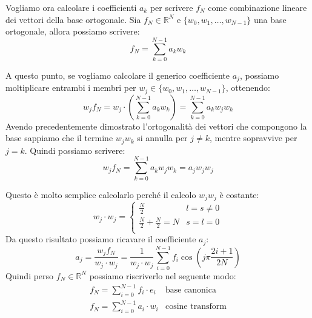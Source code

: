 Vogliamo ora calcolare i coefficienti $a_k$ per scrivere $f_N$ come combinazione
lineare dei vettori della base ortogonale. Sia $f_N \in \mathbb{R}^N$ e
$\{w_0,w_1,\dots,w_{N-1}\}$ una base ortogonale, allora possiamo scrivere:
\begin{equation*}
    f_N = \sum_{k=0}^{N-1} a_k w_k
\end{equation*}

A questo punto, se vogliamo calcolare il generico coefficiente $a_j$, possiamo
moltiplicare entrambi i membri per $w_j\in \{w_0,w_1,\dots,w_{N-1}\}$, ottenendo:
\begin{equation*}
    w_j f_N = w_j \cdot \left(\sum_{k=0}^{N-1} a_k w_k\right) = \sum_{k=0}^{N-1} a_k w_j w_k
\end{equation*}
Avendo precedentemente dimostrato l'ortogonalità dei vettori che compongono la
base sappiamo che il termine $w_j w_k$ si annulla per $j \neq k$, mentre sopravvive
per $j = k$. Quindi possiamo scrivere:
\begin{equation*}
    w_j f_N = \sum_{k=0}^{N-1} a_k w_j w_k = a_j w_j w_j
\end{equation*}

Questo è molto semplice calcolarlo perché il calcolo $w_j w_j$ è costante:
\begin{equation*}
    w_j \cdot w_j = \begin{cases}
        \frac{N}{2}                   & l = s  \ne 0 \\
        \frac{N}{2} + \frac{N}{2} = N & s=l =0       \\
    \end{cases}
\end{equation*}
Da questo risultato possiamo ricavare il coefficiente $a_j$:
\begin{equation*}
    a_j = \frac{w_j f_N}{w_j \cdot w_j} = \frac{1}{w_j \cdot w_j} \sum_{i=0}^{N-1}
    f_i \cos\left(j\pi \frac{2i+1}{2N}\right)
\end{equation*}
Quindi perso $f_N\in \mathbb{R}^N$ possiamo riscriverlo nel seguente modo:
\begin{equation*}
    \begin{array}{cl}
        f_N = \sum_{i=0}^{N-1} f_i \cdot e_i & \text{base canonica}    \\
        f_N = \sum_{i=0}^{N-1} a_i \cdot w_i & \text{cosine transform}
    \end{array}
\end{equation*}


